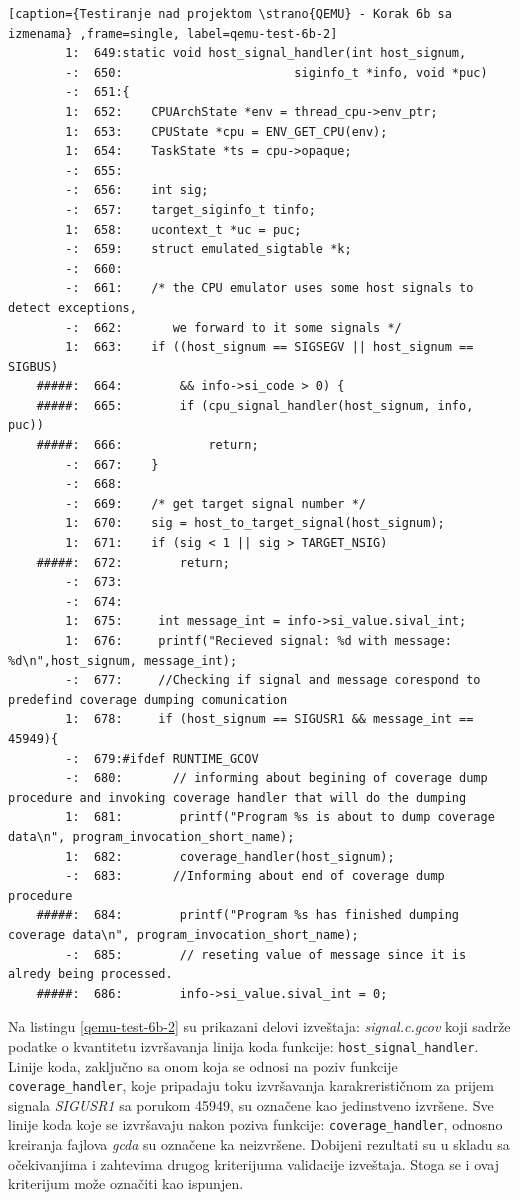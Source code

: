 \documentclass[12pt,oneside]{memoir}
\newcommand{\kod}[1]{\texttt{#1}}
\newcommand{\strano}[1]{\textit{#1}}
\begin{document}
\begin{lstlisting}[caption={Testiranje nad projektom \strano{QEMU} - Korak 6b sa izmenama} ,frame=single, label=qemu-test-6b-2]
        1:  649:static void host_signal_handler(int host_signum,
        -:  650:                        siginfo_t *info, void *puc)
        -:  651:{
        1:  652:    CPUArchState *env = thread_cpu->env_ptr;
        1:  653:    CPUState *cpu = ENV_GET_CPU(env);
        1:  654:    TaskState *ts = cpu->opaque;
        -:  655:
        -:  656:    int sig;
        -:  657:    target_siginfo_t tinfo;
        1:  658:    ucontext_t *uc = puc;
        -:  659:    struct emulated_sigtable *k;
        -:  660:
        -:  661:    /* the CPU emulator uses some host signals to detect exceptions,
        -:  662:       we forward to it some signals */
        1:  663:    if ((host_signum == SIGSEGV || host_signum == SIGBUS)
    #####:  664:        && info->si_code > 0) {
    #####:  665:        if (cpu_signal_handler(host_signum, info, puc))
    #####:  666:            return;
        -:  667:    }
        -:  668:
        -:  669:    /* get target signal number */
        1:  670:    sig = host_to_target_signal(host_signum);
        1:  671:    if (sig < 1 || sig > TARGET_NSIG)
    #####:  672:        return;
        -:  673:
        -:  674:
        1:  675:     int message_int = info->si_value.sival_int;
        1:  676:     printf("Recieved signal: %d with message: %d\n",host_signum, message_int);
        -:  677:     //Checking if signal and message corespond to predefind coverage dumping comunication
        1:  678:     if (host_signum == SIGUSR1 && message_int == 45949){
        -:  679:#ifdef RUNTIME_GCOV
        -:  680:       // informing about begining of coverage dump procedure and invoking coverage handler that will do the dumping
        1:  681:        printf("Program %s is about to dump coverage data\n", program_invocation_short_name);
        1:  682:        coverage_handler(host_signum);
        -:  683:       //Informing about end of coverage dump procedure
    #####:  684:        printf("Program %s has finished dumping coverage data\n", program_invocation_short_name);
        -:  685:        // reseting value of message since it is alredy being processed.
    #####:  686:        info->si_value.sival_int = 0;
\end{lstlisting}

Na listingu \ref{qemu-test-6b-2} su prikazani delovi izveštaja:
\strano{signal.c.gcov} koji sadrže podatke o kvantitetu izvršavanja linija koda funkcije: \kod{host\_signal\_handler}. Linije koda, zaključno sa onom koja se odnosi na poziv funkcije \kod{coverage\_handler}, koje pripadaju toku izvršavanja karakrerističnom za prijem signala \strano{SIGUSR1} sa porukom  45949, su označene kao jedinstveno izvršene. Sve linije koda koje se izvršavaju nakon poziva funkcije: \kod{coverage\_handler}, odnosno kreiranja fajlova \strano{gcda} su označene ka neizvršene. Dobijeni rezultati su u skladu sa očekivanjima i zahtevima drugog kriterijuma validacije izveštaja. Stoga se i ovaj kriterijum može označiti kao ispunjen. 
\end{document}
